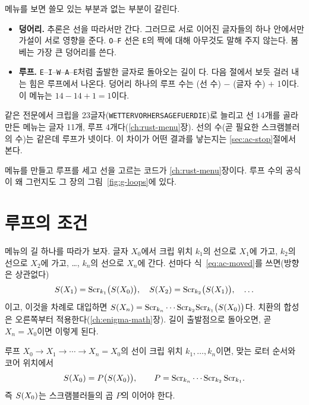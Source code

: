메뉴를 보면 쓸모 있는 부분과 없는 부분이 갈린다.

\begin{itemize}
\item \textbf{덩어리.} 추론은 선을 따라서만 간다. 그러므로 서로 이어진 글자들의 
하나 안에서만 가설이 서로 영향을 준다. \texttt{O}--\texttt{F} 선은 \texttt{E}의 짝에 대해 아무것도 말해 주지 않는다.
봄베는 가장 큰 덩어리를 쓴다.
\item \textbf{루프.} \texttt{E}--\texttt{I}--\texttt{W}--\texttt{A}--\texttt{E}처럼 출발한 글자로 돌아오는 길이
다. 다음 절에서 보듯 걸러 내는 힘은 루프에서 나온다. 덩어리 하나의 루프 수는
(선 수) $-$ (글자 수) $+$ 1이다. 이 메뉴는 $14 - 14 + 1 = 1$이다.
\end{itemize}

같은 전문에서 크립을 23글자(\texttt{WETTERVORHERSAGEFUERDIE})로 늘리고 선 14개를 골라 만든 메뉴는 글자 11개, 루프
4개다(\ref{ch:rust-menu}장). 선의 수(곧 필요한 스크램블러의 수)는 같은데 루프가 넷이다. 이 차이가 어떤 결과를 낳는지는
\ref{sec:ac-stop}절에서 본다.

\Ours 메뉴를 만들고 루프를 세고 선을 고르는 코드가 \ref{ch:rust-menu}장이다. 루프 수의 공식이 왜 그런지도 그 장의
그림~\ref{fig:g-loops}에 있다.

\section{루프의 조건}\label{sec:ac-loop}

\Why 메뉴의 길 하나를 따라가 보자. 글자 $X_0$에서 크립 위치 $k_1$의 선으로 $X_1$에 가고, $k_2$의 선으로 $X_2$에
가고, \ldots, $k_n$의 선으로 $X_n$에 간다. 선마다 식~\eqref{eq:ac-moved}를 쓰면(방향은 상관없다)
\[
  S(X_1) = \mathrm{Scr}_{k_1}\bigl(S(X_0)\bigr),\quad
  S(X_2) = \mathrm{Scr}_{k_2}\bigl(S(X_1)\bigr),\quad \ldots
\]
이고, 이것을 차례로 대입하면 $S(X_n) = \mathrm{Scr}_{k_n} \cdots \mathrm{Scr}_{k_2}\mathrm{Scr}_{k_1}\bigl(S(X_0)\bigr)$다. 치환의 합성은
오른쪽부터 적용한다(\ref{ch:enigma-math}장). 길이 출발점으로 돌아오면, 곧 $X_n = X_0$이면 이렇게 된다.

\begin{keybox}[title={루프의 조건}]
루프 $X_0 \to X_1 \to \cdots \to X_n = X_0$의 선이 크립 위치 $k_1, \ldots, k_n$이면, 맞는 로터 순서와 코어 위치에서
\begin{equation}
  S(X_0) = P\bigl(S(X_0)\bigr), \qquad P = \mathrm{Scr}_{k_n} \cdots \mathrm{Scr}_{k_2}\, \mathrm{Scr}_{k_1}. \label{eq:ac-loop}
\end{equation}
즉 $S(X_0)$는 스크램블러들의 곱 $P$의 이어야 한다.
\end{keybox}

